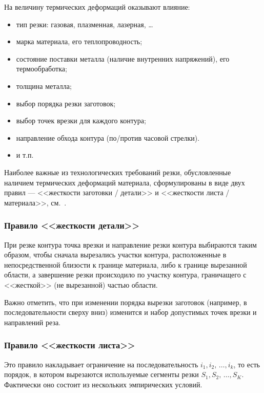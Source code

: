 На величину термических деформаций оказывают влияние:
\begin{itemize}
\item	тип резки: газовая, плазменная, лазерная, \dots
\item	марка материала, его теплопроводность;
\item	состояние поставки металла (наличие внутренних напряжений), его термообработка;
\item	толщина металла;
\item	выбор порядка резки заготовок;
\item	выбор точек врезки для каждого контура;
\item	направление обхода контура (по/против часовой стрелки).
\item и т.п.
\end{itemize}

Наиболее важные из технологических требований резки,
обусловленные наличием термических деформаций материала,
сформулированы в виде двух правил ---
<<жесткости заготовки / детали>> и <<жесткости листа / материала>>,
см.~\cite{Sozopol,Miskolc}.

\subsubsection{Правило <<жесткости детали>>}
При резке контура точка
врезки и направление резки контура выбираются таким образом,
чтобы сначала вырезались участки контура,
расположенные в непосредственной близости к границе материала,
либо к границе вырезанной области,
а завершение резки происходило по участку контура,
граничащего с <<жесткой>> (не вырезанной) частью области.

Важно отметить,
что при изменении порядка вырезки заготовок
(например, в последовательности сверху вниз)
изменится и набор допустимых точек врезки и направлений реза.

\subsubsection{Правило <<жесткости листа>>}

Это правило накладывает ограничение на
последовательность
$i_1, i_2, \,\dots, i_k$,
то есть порядок,
в котором вырезаются используемые сегменты резки
$S_1, S_2, \,\dots, S_K$.
Фактически оно состоит из нескольких
эмпирических условий.

